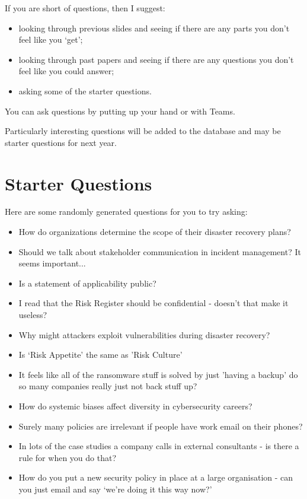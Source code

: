 \documentclass[12pt]{article}
\begin{document}
If you are short of questions, then I suggest: 

\begin{itemize} 
\item looking through previous slides and seeing if there are any parts you don't feel like you `get';
\item looking through past papers and seeing if there are any questions you don't feel like you could answer;
\item asking some of the starter questions.
\end{itemize} 

You can ask questions by putting up your hand or with Teams.  

Particularly interesting questions will be added to the database and may be starter questions for next year.  

\section*{Starter Questions} 
Here are some randomly generated questions for you to try asking: 

\begin{itemize}
  \item How do organizations determine the scope of their disaster recovery plans?
  \item Should we talk about stakeholder communication in incident management? It seems important...
  \item Is a statement of applicability public?
  \item I read that the Risk Register should be confidential - doesn't that make it useless?
  \item Why might attackers exploit vulnerabilities during disaster recovery?
  \item Is `Risk Appetite' the same as 'Risk Culture'
  \item It feels like all of the ransomware stuff is solved by just 'having a backup' do so many companies really just not back stuff up?
  \item How do systemic biases affect diversity in cybersecurity careers?
  \item Surely many policies are irrelevant if people have work email on their phones?
  \item In lots of the case studies a company calls in external consultants - is there a rule for when you do that?
  \item How do you put a new security policy in place at a large organisation - can you just email and say `we're doing it this way now?'
\end{itemize}
\end{document}
